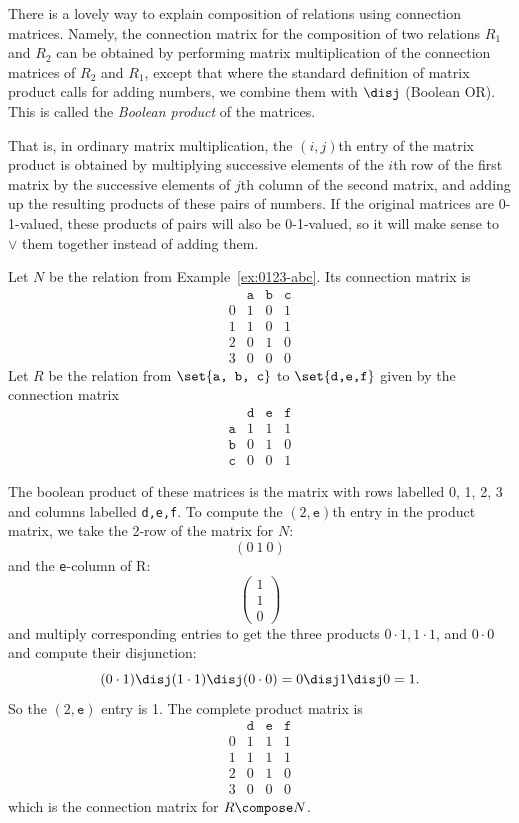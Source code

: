 There is a lovely way to explain composition of relations using connection
matrices.  Namely, the connection matrix for the composition of two
relations $R_1$ and $R_2$ can be obtained by performing matrix
multiplication of the connection matrices of $R_2$ and $R_1$, except that
where the standard definition of matrix product calls for adding numbers,
we combine them with $\disj$ (Boolean OR).  This is called the \emph{Boolean
product} of the matrices.

That is, in ordinary matrix multiplication, the $(i,j)$th entry of the
matrix product is obtained by multiplying successive elements of the $i$th
row of the first matrix by the successive elements of $j$th column of the
second matrix, and adding up the resulting products of these pairs of
numbers.  If the original matrices are 0-1-valued, these products of
pairs will also be 0-1-valued, so it will make sense to $\lor$ them
together instead of adding them.

\begin{example}
Let $N$ be the relation from Example~\ref{ex:0123-abc}.  Its connection
matrix is
\[\begin{array}{r|ccc}
& \texttt{a}&  \texttt{b}&  \texttt{c}\\
\hline  
0& 1&  0&  1\\
1& 1&  0&  1\\
2& 0&  1&  0\\
3& 0&  0&  0
\end{array}
\]
Let $R$ be the relation from $\set{\texttt{a, b, c}}$ to
$\set{\texttt{d,e,f}}$ given by the connection matrix
\[\begin{array}{r|ccc}
& \texttt{d}&  \texttt{e}&  \texttt{f}\\
\hline  
\texttt{a}& 1&  1&  1\\
\texttt{b}& 0&  1&  0\\
\texttt{c}& 0&  0&  1
\end{array}
\]

The boolean product of these matrices is the matrix with rows labelled 0,
1, 2, 3 and columns labelled \texttt{d,e,f}.  To compute the
$(2,\texttt{e})$th entry in the product matrix, we take the 2-row of the
matrix for $N$:
\[
(0\ 1\  0)
\]
and the \texttt{e}-column of R:
\[
\left(\begin{array}{c}
1\\
1\\
0
\end{array}\right)
\]
and multiply corresponding entries to get the three products $0\cdot1, 1
\cdot 1$, and $0 \cdot 0$ and compute their disjunction:
\[
(0\cdot1) \disj (1 \cdot 1) \disj (0 \cdot 0) = 0 \disj 1 \disj 0 = 1.
\]
So the $(2,\texttt{e})$ entry is 1.  The complete product matrix is
\[\begin{array}{r|ccc}
& \texttt{d} &  \texttt{e} &  \texttt{f} \\
\hline  
0& 1&  1&  1\\
1& 1&  1&  1\\
2& 0&  1&  0\\
3& 0&  0&  0
\end{array}
\]
which is the connection matrix for $R \compose N$.
\end{example}


